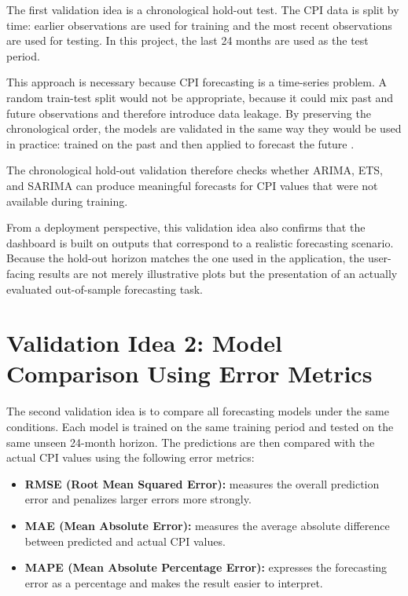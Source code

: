 The first validation idea is a chronological hold-out test. The CPI data is split by time: earlier observations are used for training and the most recent observations are used for testing. In this project, the last 24 months are used as the test period.

This approach is necessary because CPI forecasting is a time-series problem. A random train-test split would not be appropriate, because it could mix past and future observations and therefore introduce data leakage. By preserving the chronological order, the models are validated in the same way they would be used in practice: trained on the past and then applied to forecast the future \cite{Hyndman2021,Box2015}.

The chronological hold-out validation therefore checks whether ARIMA, ETS, and SARIMA can produce meaningful forecasts for CPI values that were not available during training.

From a deployment perspective, this validation idea also confirms that the dashboard is built on outputs that correspond to a realistic forecasting scenario. Because the hold-out horizon matches the one used in the application, the user-facing results are not merely illustrative plots but the presentation of an actually evaluated out-of-sample forecasting task.

\section{Validation Idea 2: Model Comparison Using Error Metrics}

The second validation idea is to compare all forecasting models under the same conditions. Each model is trained on the same training period and tested on the same unseen 24-month horizon. The predictions are then compared with the actual CPI values using the following error metrics:

\begin{itemize}
	\item \textbf{RMSE (Root Mean Squared Error):} measures the overall prediction error and penalizes larger errors more strongly.
	\item \textbf{MAE (Mean Absolute Error):} measures the average absolute difference between predicted and actual CPI values.
	\item \textbf{MAPE (Mean Absolute Percentage Error):} expresses the forecasting error as a percentage and makes the result easier to interpret.
\end{itemize}

